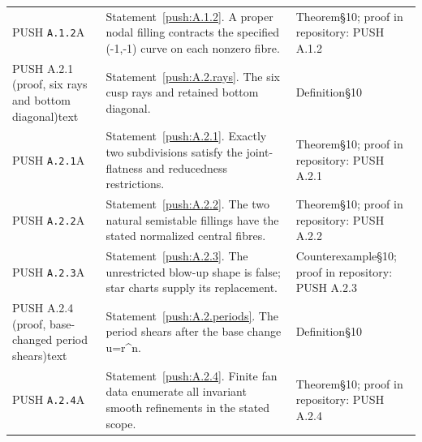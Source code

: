 \begin{longtable}{@{}L{.18\linewidth}L{.48\linewidth}L{.29\linewidth}@{}}
PUSH \nolinkurl{A.1.2}\newline A & Statement~\ref{push:A.1.2}. A proper nodal filling contracts the specified (-1,-1) curve on each nonzero fibre.\newline {} & Theorem\newline §10; proof in repository:\allowbreak{} PUSH A.1.2\\
PUSH A.2.1 (proof, six rays and bottom diagonal)\newline text & Statement~\ref{push:A.2.rays}. The six cusp rays and retained bottom diagonal.\newline {} & Definition\newline §10\\
PUSH \nolinkurl{A.2.1}\newline A & Statement~\ref{push:A.2.1}. Exactly two subdivisions satisfy the joint-flatness and reducedness restrictions.\newline {} & Theorem\newline §10; proof in repository:\allowbreak{} PUSH A.2.1\\
PUSH \nolinkurl{A.2.2}\newline A & Statement~\ref{push:A.2.2}. The two natural semistable fillings have the stated normalized central fibres.\newline {} & Theorem\newline §10; proof in repository:\allowbreak{} PUSH A.2.2\\
PUSH \nolinkurl{A.2.3}\newline A & Statement~\ref{push:A.2.3}. The unrestricted blow-up shape is false; star charts supply its replacement.\newline {} & Counterexample\newline §10; proof in repository:\allowbreak{} PUSH A.2.3\\
PUSH A.2.4 (proof, base-changed period shears)\newline text & Statement~\ref{push:A.2.periods}. The period shears after the base change u=r\textasciicircum{}n.\newline {} & Definition\newline §10\\
PUSH \nolinkurl{A.2.4}\newline A & Statement~\ref{push:A.2.4}. Finite fan data enumerate all invariant smooth refinements in the stated scope.\newline {} & Theorem\newline §10; proof in repository:\allowbreak{} PUSH A.2.4\\

\end{longtable}
